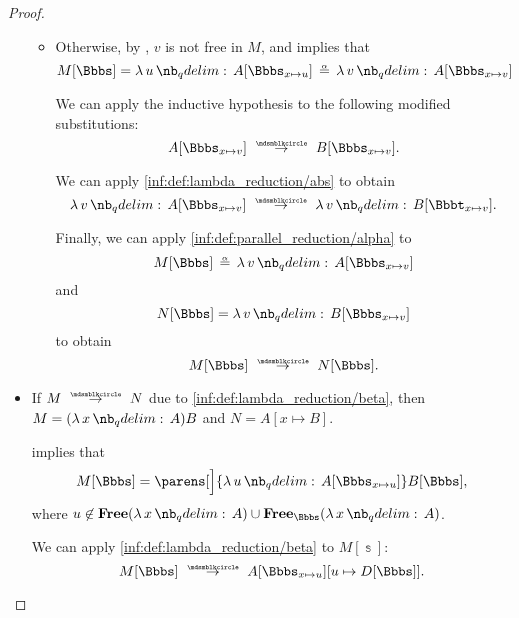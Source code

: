 \begin{proof}
\begin{itemize}
\begin{itemize}
      \item Otherwise, by , \( v \) is not free in \( M \), and  implies that
      \begin{equation*}
        M[\Bbbs]
        =
        \qabs u A[\Bbbs_{x \mapsto u}]
        \aequiv
        \qabs v A[\Bbbs_{x \mapsto v}]
      \end{equation*}

      We can apply the inductive hypothesis to the following modified substitutions:
      \begin{equation*}
        A[\Bbbs_{x \mapsto v}] \pred B[\Bbbs_{x \mapsto v}].
      \end{equation*}

      We can apply \ref{inf:def:lambda_reduction/abs} to obtain
      \begin{equation*}
        \qabs v A[\Bbbs_{x \mapsto v}] \pred \qabs v B[\Bbbt_{x \mapsto v}].
      \end{equation*}

      Finally, we can apply \ref{inf:def:parallel_reduction/alpha} to
      \begin{equation*}
        M[\Bbbs] \aequiv \qabs v A[\Bbbs_{x \mapsto v}]
      \end{equation*}
      and
      \begin{equation*}
        N[\Bbbs] = \qabs v B[\Bbbs_{x \mapsto v}]
      \end{equation*}
      to obtain
      \begin{equation*}
        M[\Bbbs] \pred N[\Bbbs].
      \end{equation*}
    \end{itemize}

    \item If \( M \pred N \) due to \ref{inf:def:lambda_reduction/beta}, then \( M = (\qabs x A)B \) and \( N = A[x \mapsto B] \).

     implies that
    \begin{equation*}
      M[\Bbbs] = \parens[\Big]{ \qabs u A[\Bbbs_{x \mapsto u}] } B[\Bbbs],
    \end{equation*}
    where \( u \not\in \op*{Free}(\qabs x A) \cup \op*{Free}_\Bbbs(\qabs x A) \).

    We can apply \ref{inf:def:lambda_reduction/beta} to \( M[\Bbbs] \):
    \begin{equation*}
      M[\Bbbs]
      \pred
      A[\Bbbs_{x \mapsto u}][u \mapsto D[\Bbbs]].
    \end{equation*}


\end{itemize}
\end{proof}
